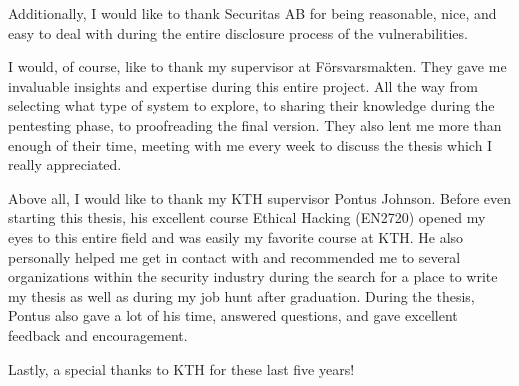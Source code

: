 Additionally, I would like to thank Securitas AB for being reasonable, nice, and easy to deal with during the entire disclosure process of the vulnerabilities.

I would, of course, like to thank my supervisor at Försvarsmakten. They gave me invaluable insights and expertise during this entire project. All the way from selecting what type of system to explore, to sharing their knowledge during the pentesting phase, to proofreading the final version. They also lent me more than enough of their time, meeting with me every week to discuss the thesis which I really appreciated.

Above all, I would like to thank my KTH supervisor Pontus Johnson. Before even starting this thesis, his excellent course Ethical Hacking (EN2720) opened my eyes to this entire field and was easily my favorite course at KTH. He also personally helped me get in contact with and recommended me to several organizations within the security industry during the search for a place to write my thesis as well as during my job hunt after graduation. During the thesis, Pontus also gave a lot of his time, answered questions, and gave excellent feedback and encouragement.

Lastly, a special thanks to KTH for these last five years!

\acknowlegmentssignature

\tableofcontents
\markboth{\contentsname}{}

\clearpage\listoffigures
\clearpage\listoftables
\clearpage\printglossary[type=\acronymtype, title={List of acronyms and abbreviations}]
